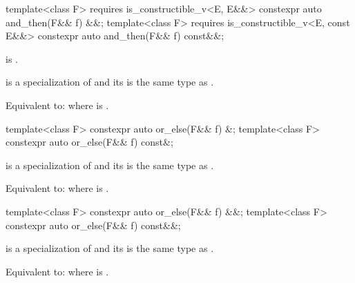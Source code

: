 %
\begin{itemdecl}
template<class F>
  requires is_constructible_v<E, E&&>
constexpr auto and_then(F&& f) &&;
template<class F>
  requires is_constructible_v<E, const E&&>
constexpr auto and_then(F&& f) const&&;
\end{itemdecl}

\begin{itemdescr}
\pnum
\constraints
{} is .

\pnum
\mandates
{} is a specialization of  and its  is the same type as .

\pnum
\effects
Equivalent to:  where  is .
\end{itemdescr}

%
\begin{itemdecl}
template<class F> constexpr auto or_else(F&& f) &;
template<class F> constexpr auto or_else(F&& f) const&;
\end{itemdecl}

\begin{itemdescr}
\pnum
\mandates
{} is a specialization of  and its  is the same type as .

\pnum
\effects
Equivalent to:  where  is .
\end{itemdescr}

%
\begin{itemdecl}
template<class F> constexpr auto or_else(F&& f) &&;
template<class F> constexpr auto or_else(F&& f) const&&;
\end{itemdecl}

\begin{itemdescr}
\pnum
\mandates
{} is a specialization of  and its  is the same type as .

\pnum
\effects
Equivalent to:  where  is .
\end{itemdescr}


